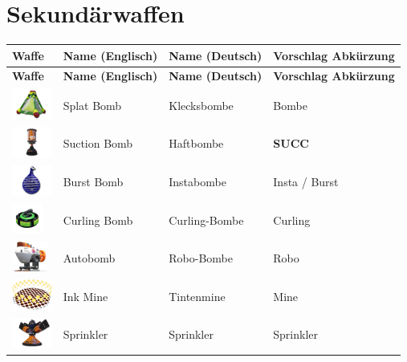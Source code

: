 \documentclass{scrreprt}
\begin{document}
\section{Sekundärwaffen}
\begin{center}
	\begin{longtable}{|m{3.5cm}|m{4cm}|m{4cm}|m{2cm}|}
		\hline
		\textbf{Waffe} & \textbf{Name (Englisch)} & \textbf{Name (Deutsch)} & \textbf{Vorschlag Abkürzung} \\ \hline
		\hline
		\endfirsthead
		\hline
		\textbf{Waffe} & \textbf{Name (Englisch)} & \textbf{Name (Deutsch)} & \textbf{Vorschlag Abkürzung} \\ \hline
		\hline
		\endhead
		\hline
		\includegraphics[height=1cm]{img/splatbomb.png} & Splat Bomb & Klecksbombe & Bombe \\ \hline
		\includegraphics[height=1cm]{img/suctionbomb.png} & Suction Bomb & Haftbombe & \textbf{SUCC} \\ \hline
		\includegraphics[height=1cm]{img/burstbomb.png} & Burst Bomb & Instabombe & Insta / Burst \\ \hline
		\includegraphics[height=1cm]{img/curlingbomb.png} & Curling Bomb & Curling-Bombe & Curling \\ \hline
		\includegraphics[height=1cm]{img/autobomb.png} & Autobomb & Robo-Bombe & Robo \\ \hline
		\includegraphics[height=1cm]{img/inkmine.png} & Ink Mine & Tintenmine & Mine\\ \hline
		\includegraphics[height=1cm]{img/sprinkler.png} & Sprinkler & Sprinkler & Sprinkler \\ \hline

\end{longtable}
\end{center}
\end{document}
